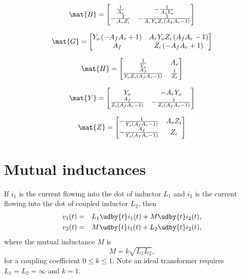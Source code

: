 \documentclass[a4paper, 12pt]{article}
\begin{document}
\begin{equation}
\mat{B} = \left[\begin{matrix}\frac{1}{A_{r}} & - \frac{1}{A_{r} Y_{o}}\\- \frac{1}{A_{r} Z_{i}} & - \frac{1}{A_{r} Y_{o} Z_{i} \left(A_{f} A_{r} - 1\right)}\end{matrix}\right]
\end{equation}

\begin{equation}
\mat{G} = \left[\begin{matrix}Y_{o} \left(- A_{f} A_{r} + 1\right) & A_{r} Y_{o} Z_{i} \left(A_{f} A_{r} - 1\right)\\A_{f} & Z_{i} \left(- A_{f} A_{r} + 1\right)\end{matrix}\right]
\end{equation}

\begin{equation}
\mat{H} = \left[\begin{matrix}\frac{1}{Y_{o}} & A_{r}\\\frac{A_{f}}{Y_{o} Z_{i} \left(A_{f} A_{r} - 1\right)} & \frac{1}{Z_{i}}\end{matrix}\right]
\end{equation}

\begin{equation}
\mat{Y} = \left[\begin{matrix}Y_{o} & - A_{r} Y_{o}\\\frac{A_{f}}{Z_{i} \left(A_{f} A_{r} - 1\right)} & - \frac{1}{Z_{i} \left(A_{f} A_{r} - 1\right)}\end{matrix}\right]
\end{equation}

\begin{equation}
\mat{Z} = \left[\begin{matrix}- \frac{1}{Y_{o} \left(A_{f} A_{r} - 1\right)} & A_{r} Z_{i}\\- \frac{A_{f}}{Y_{o} \left(A_{f} A_{r} - 1\right)} & Z_{i}\end{matrix}\right]
\end{equation}



\section{Mutual inductances}


If $i_1$ is the current flowing into the dot of inductor $L_1$ and
$i_2$ is the current flowing into the dot of coupled inductor $L_2$,
%
then
%
\begin{eqnarray}
 v_1(t) & = & L_1 \udby{t} i_1(t) + M \udby{t} i_2(t),\\
 v_2(t) & = & M \udby{t} i_1(t) + L_2 \udby{t} i_2(t),
\label{eqn:mut}
\end{eqnarray}
%
where the mutual inductance $M$ is
%
\begin{equation}
  M = k \sqrt{L_1 L_2},
\end{equation}
%
for a coupling coefficient $0 \le k \le 1$.  Note an ideal transformer
requires $L_1 = L_2 = \infty$ and $k=1$.
\end{document}
